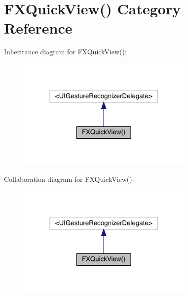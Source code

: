 \hypertarget{category_f_x_quick_view_07_08}{}\section{F\+X\+Quick\+View() Category Reference}
\label{category_f_x_quick_view_07_08}


Inheritance diagram for F\+X\+Quick\+View()\+:\nopagebreak
\begin{figure}[H]
\begin{center}
\leavevmode
\includegraphics[width=244pt]{category_f_x_quick_view_07_08__inherit__graph}
\end{center}
\end{figure}


Collaboration diagram for F\+X\+Quick\+View()\+:\nopagebreak
\begin{figure}[H]
\begin{center}
\leavevmode
\includegraphics[width=244pt]{category_f_x_quick_view_07_08__coll__graph}
\end{center}
\end{figure}
